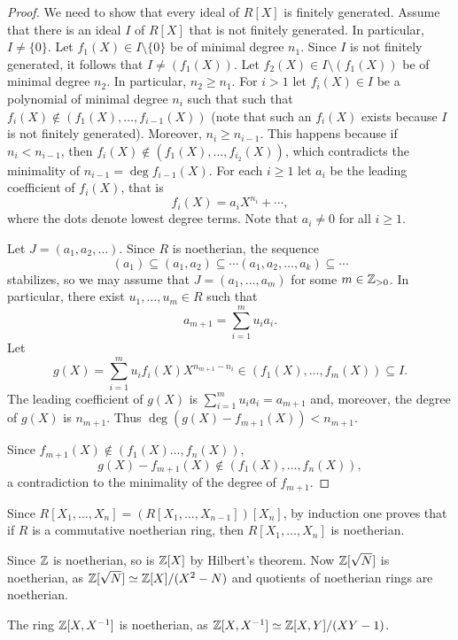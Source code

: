 \begin{proof}
	We need to show that every ideal of $R[X]$ is finitely generated. Assume that
	there is an ideal $I$ of $R[X]$ that is not finitely generated. In particular, $I\ne\{0\}$. 
	Let $f_1(X)\in I\setminus\{0\}$ be of minimal degree $n_1$. 
	Since $I$ is not finitely generated, it follows that 
	$I\ne (f_1(X))$. Let $f_2(X)\in I\setminus (f_1(X))$ be
	of minimal degree $n_2$. In particular, $n_2\geq n_1$. 
	For $i>1$ let 
	$f_i(X)\in I$ be a polynomial of minimal degree $n_i$ such that  
	such that $f_i(X)\not\in(f_1(X),\dots,f_{i-1}(X))$ (note
	that such an $f_i(X)$ exists because $I$ is not finitely generated). 
	Moreover, $n_i\geq n_{i-1}$. This happens because 
	if $n_i<n_{i-1}$, then
	$f_i(X)\not\in (f_1(X),\dots,f_{i_2}(X))$, which contradicts
	the minimality of $n_{i-1}=\deg f_{i-1}(X)$. 
	For each $i\geq1$ 
	let $a_i$ be the leading coefficient of $f_i(X)$, that is
	\[
	f_i(X)=a_iX^{n_i}+\cdots,
	\]
	where the dots denote lowest degree terms. Note that 
	$a_i\ne 0$ for all $i\geq 1$. 
	
	Let $J=(a_1,a_2,\dots)$. Since $R$ is noetherian, the sequence
	\[
	(a_1)\subseteq (a_1,a_2)\subseteq\cdots(a_1,a_2,\dots,a_k)\subseteq\cdots
	\]
	stabilizes, so we may assume that 
	$J=(a_1,\dots,a_m)$ for some $m\in\mathbb{Z}_{>0}$. 
	In particular, there exist $u_1,\dots,u_m\in R$ such that 
	\[
	a_{m+1}=\sum_{i=1}^m u_ia_i.
	\]
	Let 
	\[
	g(X)=\sum_{i=1}^mu_if_i(X)X^{n_{m+1}-n_i}\in (f_1(X),\dots,f_m(X))\subseteq I.
	\]
	The leading coefficient of $g(X)$ is $\sum_{i=1}^mu_ia_i=a_{m+1}$ and, moreover, 
	the degree of $g(X)$ is $n_{m+1}$. Thus $\deg(g(X)-f_{m+1}(X))<n_{m+1}$. 
	
	Since $f_{m+1}(X)\not\in (f_1(X)\dots,f_n(X))$, 
	\[
	g(X)-f_{m+1}(X)\not\in (f_1(X),\dots,f_n(X)),
	\]
	a contradiction to the minimality of the degree of $f_{m+1}$.  
\end{proof}

Since $R[X_1,\dots,X_n]=(R[X_1,\dots,X_{n-1}])[X_n]$, by induction 
one proves that if $R$ is a commutative noetherian ring, 
then $R[X_1,\dots,X_n]$ is noetherian. 
 
\begin{example}
	Since $\mathbb{Z}$ is noetherian, so is $\mathbb{Z}[X]$ by Hilbert's theorem. Now 
	$\mathbb{Z}[\sqrt{N}]$ is noetherian, as $\mathbb{Z}[\sqrt{N}]\simeq\mathbb{Z}[X]/(X^2-N)$ and quotients
	of noetherian rings are noetherian.  	
\end{example}

\begin{example}
	The ring $\mathbb{Z}[X,X^{-1}]$ is noetherian, as $\mathbb{Z}[X,X^{-1}]\simeq\mathbb{Z}[X,Y]/(XY-1)$. 
\end{example}
 
